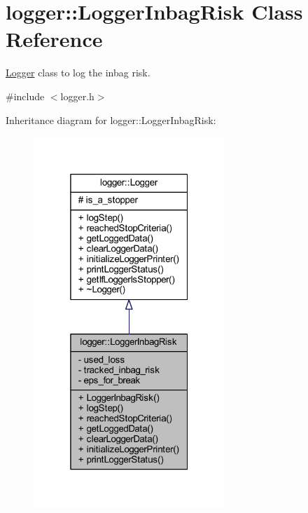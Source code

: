 \hypertarget{classlogger_1_1_logger_inbag_risk}{}\section{logger\+:\+:Logger\+Inbag\+Risk Class Reference}
\label{classlogger_1_1_logger_inbag_risk}


\mbox{\hyperlink{classlogger_1_1_logger}{Logger}} class to log the inbag risk.  




{\ttfamily \#include $<$logger.\+h$>$}



Inheritance diagram for logger\+:\+:Logger\+Inbag\+Risk\+:
\nopagebreak
\begin{figure}[H]
\begin{center}
\leavevmode
\includegraphics[width=205pt]{classlogger_1_1_logger_inbag_risk__inherit__graph}
\end{center}
\end{figure}


